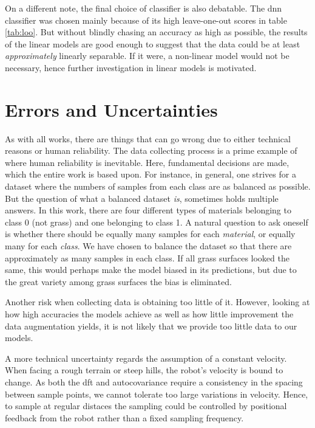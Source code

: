 On a different note, the final choice of classifier is also debatable. The \gls{dnn} classifier was chosen mainly because of its high leave-one-out scores in table \ref{tab:loo}. But without blindly chasing an accuracy as high as possible, the results of the linear models are good enough to suggest that the data could be at least \textit{approximately} linearly separable. If it were, a non-linear model would not be necessary, hence further investigation in linear models is motivated.

\section{Errors and Uncertainties}
As with all works, there are things that can go wrong due to either technical reasons or human reliability. The data collecting process is a prime example of where human reliability is inevitable. Here, fundamental decisions are made, which the entire work is based upon. For instance, in general, one strives for a dataset where the numbers of samples from each class are as balanced as possible. But the question of what a balanced dataset \textit{is}, sometimes holds multiple answers. In this work, there are four different types of materials belonging to class 0 (not grass) and one belonging to class 1. A natural question to ask oneself is whether there should be equally many samples for each \textit{material}, or equally many for each \textit{class}. We have chosen to balance the dataset so that there are approximately as many samples in each class. If all grass surfaces looked the same, this would perhaps make the model biased in its predictions, but due to the great variety among grass surfaces the bias is eliminated.

Another risk when collecting data is obtaining too little of it. However, looking at how high accuracies the models achieve as well as how little improvement the data augmentation yields, it is not likely that we provide too little data to our models.

A more technical uncertainty regards the assumption of a constant velocity. When facing a rough terrain or steep hills, the robot's velocity is bound to change. As both the \gls{dft} and autocovariance require a consistency in the spacing between sample points, we cannot tolerate too large variations in velocity. Hence, to sample at regular distaces the sampling could be controlled by positional feedback from the robot rather than a fixed sampling frequency.


